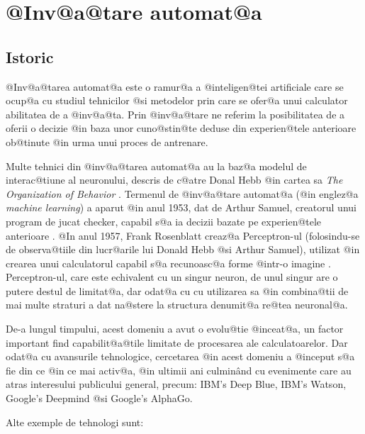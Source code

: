 \newpage

\chapter{ @Inv@a@tare automat@a }

\section{Istoric}


	@Inv@a@tarea automat@a este o ramur@a a @inteligen@tei artificiale care se ocup@a cu studiul tehnicilor @si metodelor prin care se ofer@a unui calculator abilitatea de a @inv@a@ta. Prin @inv@a@tare ne referim la posibilitatea de a oferii o decizie @in baza unor cuno@stin@te deduse din experien@tele anterioare ob@tinute @in urma unui proces de antrenare.

 Multe tehnici din @inv@a@tarea automat@a au la baz@a modelul de interac@tiune al neuronului, descris de c@atre Donal Hebb @in cartea sa {\sl The Organization of Behavior} \cite{donald-hebb-book}. Termenul de @inv@a@tare automat@a (@in englez@a {\sl machine learning}) a aparut @in anul 1953, dat de Arthur Samuel, creatorul unui program de jucat checker, capabil s@a ia decizii bazate pe experien@tele anterioare \cite{arthur-samuel}. @In anul 1957, Frank Rosenblatt creaz@a Perceptron-ul (folosindu-se de observa@tiile din lucr@arile lui Donald Hebb @si Arthur Samuel), utilizat @in crearea unui calculatorul capabil s@a recunoasc@a forme @intr-o imagine . Perceptron-ul, care este echivalent cu un singur neuron, de unul singur are o putere destul de limitat@a, dar odat@a cu cu  utilizarea sa @in combina@tii de mai multe straturi a dat na@stere la structura denumit@a re@tea neuronal@a. 
 
 De-a lungul timpului, acest domeniu a avut o evolu@tie @inceat@a, un factor important find capabilit@a@tile limitate de procesarea ale calculatoarelor. Dar odat@a cu avansurile tehnologice, cercetarea @in acest domeniu a @inceput s@a fie din ce @in ce mai activ@a, @in ultimii ani culmin\^ and cu evenimente care au atras interesului publicului general, precum: IBM's Deep Blue, IBM's Watson, Google's Deepmind @si Google's AlphaGo.

Alte exemple de tehnologi sunt:

